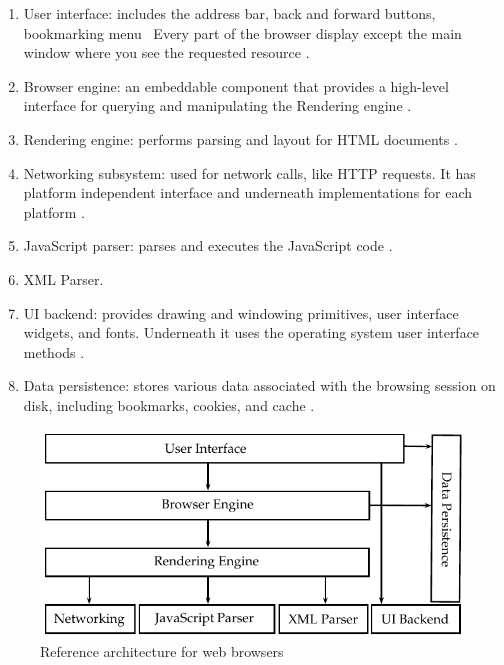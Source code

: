 \begin{enumerate}
  \item User interface: includes the address bar, back and forward buttons, bookmarking menu \etc\ Every part of the browser display except the main window where you see the requested resource \cite{Grosskurth2005}.
  \item Browser engine: an embeddable component that provides a high-level interface for querying and manipulating the Rendering engine \cite{Grosskurth2005} \cite{Rocks2013}.
  \item Rendering engine: performs parsing and layout for HTML documents \cite{Grosskurth2005} \cite{Rocks2013}.
  \item Networking subsystem: used for network calls, like HTTP requests. It has platform independent interface and underneath implementations for each platform \cite{Grosskurth2005} \cite{Rocks2013}.
  \item JavaScript parser: parses and executes the JavaScript code \cite{Grosskurth2005}.
  \item XML Parser.
  \item UI backend: provides drawing and windowing primitives, user interface widgets, and fonts. Underneath it uses the operating system user interface methods \cite{Grosskurth2005}.
  \item Data persistence: stores various data associated with the browsing session on disk, including bookmarks, cookies, and cache \cite{Grosskurth2005} \cite{Rocks2013}.
\end{enumerate}

\begin{figure}[!htb]
  \centering
  \includegraphics{chapters/basic_concepts/web_architecture.pdf}
  \caption{Reference architecture for web browsers}
  \label{figure:web_architecture}
\end{figure}


